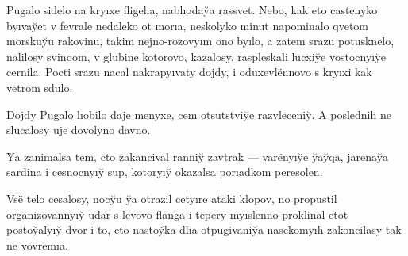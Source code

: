\documentclass[10pt]{book}
\begin{document}
\newcommand{\e}{ë}

\renewcommand{\i}{ı}

\newcommand{\yi}{yı}

\newcommand{\ia}{ıa}

\newcommand{\iu}{ıo}

\newcommand{\y}{y̆}

\newcommand{\Y}{Y̆}

\newcommand{\C}{C}
\renewcommand{\c}{c}

\newcommand{\X}{X̨}
\newcommand{\x}{x̨}
\newcommand{\Q}{Q}
\newcommand{\q}{q}

% 
% 
% 
% 

Pugalo sidelo na kr{\yi}xe fligel{\ia}, nabl{\iu}da{\y}a rassvet. Nebo, kak eto {\c}astenyko b{\yi}va{\y}et v fevrale nedaleko ot mor{\ia}, neskolyko minut napominalo {\q}vetom morsku{\y}u rakovinu, takim nejno-rozov{\yi}m ono b{\yi}lo, a zatem srazu potusknelo, nalilosy svin{\q}om, v glubine kotorovo, kazalosy, raspleskali lu{\c}xi{\y}e vosto{\c}n{\yi}{\y}e {\c}ernila. Po{\c}ti srazu na{\c}al nakrap{\yi}vaty dojdy, i oduxevl{\e}nnovo s kr{\yi}xi kak vetrom sdulo.

Dojdy Pugalo l{\iu}bilo daje menyxe, {\c}em otsutstvi{\y}e razvle{\c}eni{\y}. A poslednih ne slu{\c}alosy uje dovolyno davno.

{\Y}a zanimalsa tem, {\c}to zakan{\c}ival ranni{\y} zavtrak — var{\e}n{\yi}{\y}e {\y}a{\y}{\q}a, jarena{\y}a sardina i {\c}esno{\c}n{\yi}{\y} sup, kotor{\yi}{\y} okazalsa por{\ia}dkom peresolen.

Vs{\e} telo {\c}esalosy, no{\c}{\y}u {\y}a otrazil {\c}et{\yi}re ataki klopov, no propustil organizovann{\yi}{\y} udar s levovo flanga i tepery m{\yi}slenno proklinal etot posto{\y}al{\yi}{\y} dvor i to, {\c}to nasto{\y}ka dl{\ia} otpugivani{\y}a nasekom{\yi}h zakon{\c}ilasy tak ne vovrem{\ia}.
\end{document}
